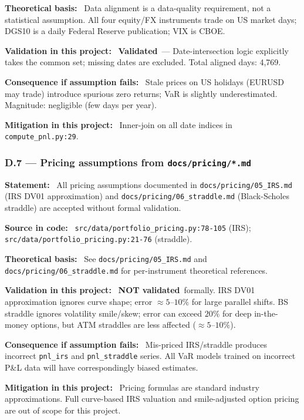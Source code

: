 \documentclass[11pt,a4paper]{article}
\newcommand{\asmfield}[1]{\medskip\noindent\textbf{#1:}\ }
\newcommand{\code}[1]{\texttt{#1}}
\newcommand{\validated}{\textbf{Validated}}
\newcommand{\notvalidated}{\textbf{NOT validated}}
\begin{document}
\asmfield{Theoretical basis}
Data alignment is a data-quality requirement, not a statistical assumption.
All four equity/FX instruments trade on US market days; DGS10 is a daily
Federal Reserve publication; VIX is CBOE.

\asmfield{Validation in this project}
\validated\ --- Date-intersection logic explicitly takes the common set;
missing dates are excluded. Total aligned days: 4{,}769.

\asmfield{Consequence if assumption fails}
Stale prices on US holidays (EURUSD may trade) introduce spurious zero
returns; VaR is slightly underestimated. Magnitude: negligible (few days
per year).

\asmfield{Mitigation in this project}
Inner-join on all date indices in \code{compute\_pnl.py:29}.

\subsubsection{D.7 --- Pricing assumptions from \texttt{docs/pricing/*.md}}\label{asm:D7}

\asmfield{Statement}
All pricing assumptions documented in \code{docs/pricing/05\_IRS.md} (IRS
DV01 approximation) and \code{docs/pricing/06\_straddle.md} (Black-Scholes
straddle) are accepted without formal validation.

\asmfield{Source in code}
\code{src/data/portfolio\_pricing.py:78-105} (IRS);
\code{src/data/portfolio\_pricing.py:21-76} (straddle).

\asmfield{Theoretical basis}
See \code{docs/pricing/05\_IRS.md} and \code{docs/pricing/06\_straddle.md}
for per-instrument theoretical references.

\asmfield{Validation in this project}
\notvalidated\ formally. IRS DV01 approximation ignores curve shape;
error $\approx 5$--$10\%$ for large parallel shifts. BS straddle ignores
volatility smile/skew; error can exceed $20\%$ for deep in-the-money options,
but ATM straddles are less affected ($\approx 5$--$10\%$).

\asmfield{Consequence if assumption fails}
Mis-priced IRS/straddle produces incorrect \code{pnl\_irs} and
\code{pnl\_straddle} series. All VaR models trained on incorrect P\&L data
will have correspondingly biased estimates.

\asmfield{Mitigation in this project}
Pricing formulas are standard industry approximations. Full curve-based IRS
valuation and smile-adjusted option pricing are out of scope for this project.
\end{document}
